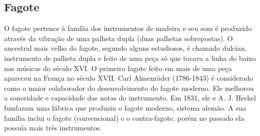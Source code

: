 \subsection*{Fagote}

O fagote pertence à família dos instrumentos de madeira e seu
som é produzido através da vibração de uma palheta dupla (duas
palhetas sobrepostas). O ancestral mais velho do fagote, segundo
alguns estudiosos, é chamado dulcian, instrumento de palheta dupla e
feito de uma peça só que tocava a linha do baixo nas músicas do século
XVI. O primeiro fagote feito em mais de uma peça apareceu na França no
século XVII. Carl Almenräder (1786-1843) é considerado como o maior
colaborador do desenvolvimento do fagote moderno. Ele melhorou a
sonoridade e capacidade das notas do instrumento. Em 1831, ele e
A. J. Heckel fundaram uma fábrica que produziu o fagote moderno,
sistema alemão. A sua família inclui o fagote (convencional) e o
contra-fagote, porém no passado ela possuía mais três instrumentos.